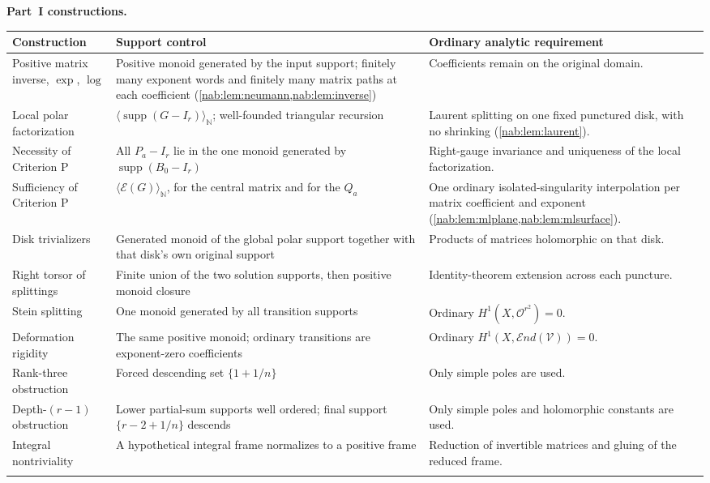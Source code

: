 \documentclass[11pt,letterpaper]{article}
\theoremstyle{definition}
\theoremstyle{remark}
\newcommand{\N}{\mathbb N}
\newcommand{\OO}{\mathcal O}
\newcommand{\supp}{\operatorname{supp}}
\newcommand{\Endsh}{\mathcal End}
\newcommand{\EU}{\mathcal E}
\newcommand{\angles}[1]{\langle #1\rangle_{\N}}
\numberwithin{equation}{section}
\begin{document}
\medskip\noindent\textbf{Part~I constructions.}
\begin{center}\small
\begin{tabular}{@{}L{0.26\textwidth}L{0.35\textwidth}L{0.29\textwidth}@{}}
\toprule
Construction & Support control & Ordinary analytic requirement\\
\midrule
Positive matrix inverse, $\exp$, $\log$ &
Positive monoid generated by the input support; finitely many exponent words
and finitely many matrix paths at each coefficient
(\cref{nab:lem:neumann,nab:lem:inverse}) &
Coefficients remain on the original domain.\\ \addlinespace[0.35em]
Local polar factorization &
$\angles{\supp(G-I_r)}$; well-founded triangular recursion &
Laurent splitting on one fixed punctured disk, with no shrinking
(\cref{nab:lem:laurent}).\\ \addlinespace[0.35em]
Necessity of Criterion P &
All $P_a-I_r$ lie in the one monoid generated by $\supp(B_0-I_r)$ &
Right-gauge invariance and uniqueness of the local factorization.\\ \addlinespace[0.35em]
Sufficiency of Criterion P &
$\angles{\EU(G)}$, for the central matrix and for the $Q_a$ &
One ordinary isolated-singularity interpolation per matrix coefficient and
exponent (\cref{nab:lem:mlplane,nab:lem:mlsurface}).\\ \addlinespace[0.35em]
Disk trivializers &
Generated monoid of the global polar support together with that disk's own
original support &
Products of matrices holomorphic on that disk.\\ \addlinespace[0.35em]
Right torsor of splittings &
Finite union of the two solution supports, then positive monoid closure &
Identity-theorem extension across each puncture.\\ \addlinespace[0.35em]
Stein splitting &
One monoid generated by all transition supports &
Ordinary $H^1(X,\OO^{r^2})=0$.\\ \addlinespace[0.35em]
Deformation rigidity &
The same positive monoid; ordinary transitions are exponent-zero coefficients
&
Ordinary $H^1(X,\Endsh(\mathcal V))=0$.\\ \addlinespace[0.35em]
Rank-three obstruction &
Forced descending set $\{1+1/n\}$ &
Only simple poles are used.\\ \addlinespace[0.35em]
Depth-$(r-1)$ obstruction &
Lower partial-sum supports well ordered; final support $\{r-2+1/n\}$ descends
&
Only simple poles and holomorphic constants are used.\\ \addlinespace[0.35em]
Integral nontriviality &
A hypothetical integral frame normalizes to a positive frame &
Reduction of invertible matrices and gluing of the reduced frame.\\ \addlinespace[0.35em]
\bottomrule
\end{tabular}
\end{center}
\end{document}
